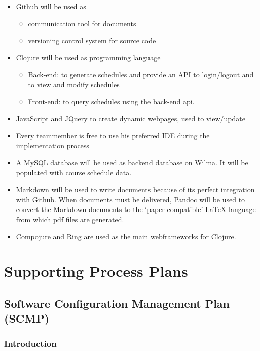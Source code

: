\documentclass[12pt]{article}
\begin{document}
\begin{itemize}
\itemsep1pt\parskip0pt
\item
  Github will be used as

  \begin{itemize}
  \itemsep1pt\parskip0pt
  \item
    communication tool for documents
  \item
    versioning control system for source code
  \end{itemize}
\item
  Clojure will be used as programming language

  \begin{itemize}
  \itemsep1pt\parskip0pt
  \item
    Back-end: to generate schedules and provide an API to login/logout
    and to view and modify schedules
  \item
    Front-end: to query schedules using the back-end api.
  \end{itemize}
\item
  JavaScript and JQuery to create dynamic webpages, used to view/update
\item
  Every teammember is free to use his preferred IDE during the
  implementation process
\item
  A MySQL database will be used as backend database on Wilma. It will be
  populated with course schedule data.
\item
  Markdown will be used to write documents because of its perfect
  integration with Github. When documents must be delivered, Pandoc will
  be used to convert the Markdown documents to the `paper-compatible'
  LaTeX language from which pdf files are generated.
\item
  Compojure and Ring are used as the main webframeworks for Clojure.
\end{itemize}

\section{Supporting Process Plans}\label{supporting-process-plans}

\subsection{Software Configuration Management Plan
(SCMP)}\label{software-configuration-management-plan-scmp}

\subsubsection{Introduction}\label{introduction}
\end{document}
